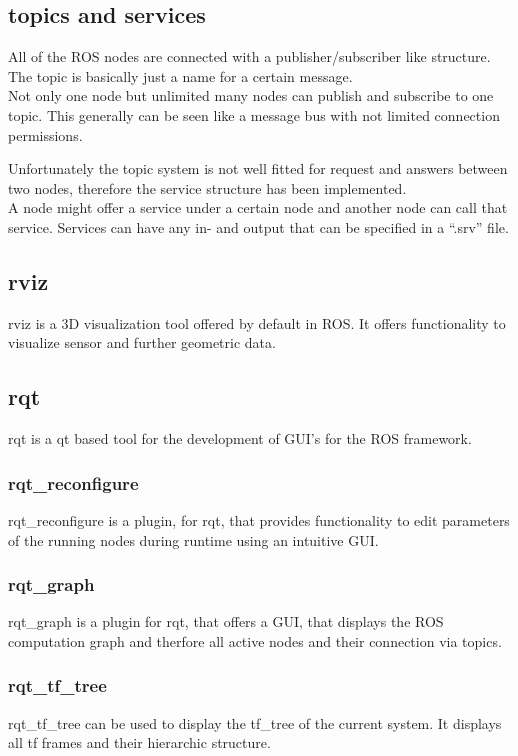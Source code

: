 \subsection{topics and services}
All of the ROS nodes are connected with a publisher/subscriber like structure. The topic is basically just a name for a certain message.\\

Not only one node but unlimited many nodes can publish and subscribe to one topic. This generally can be seen like a message bus with not limited connection permissions\cite{rosconcepts}.

Unfortunately the topic system is not well fitted for request and answers between two nodes, therefore the service structure has been implemented.\\ 
A node might offer a service under a certain node and another node can call that service. Services can have any in- and output that can be specified in a ``.srv'' file\cite{rosconcepts}.

\subsection{rviz}
rviz is a 3D visualization tool offered by default in ROS. It offers functionality to visualize sensor and further geometric data.\\
\subsection{rqt}
rqt is a qt based tool for the development of GUI's for the ROS framework\cite{rqt}.
\subsubsection{rqt\_reconfigure}
	rqt\_reconfigure is a plugin, for rqt, that provides functionality to edit parameters of the running nodes during runtime using an intuitive GUI\cite{rqtrecon}.
	
\subsubsection{rqt\_graph}

	rqt\_graph is a plugin for rqt, that offers a GUI, that displays the ROS computation graph and therfore all active nodes and their connection via topics\cite{rqtgraph}.
\subsubsection{rqt\_tf\_tree}
	rqt\_tf\_tree can be used to display the tf\_tree of the current system. It displays all tf frames and their hierarchic structure\cite{rqttftree}.
